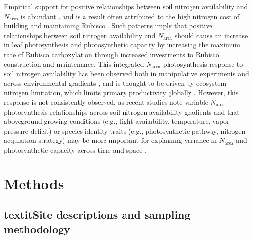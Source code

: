     Empirical support for positive relationships between soil nitrogen availability and $N_\mathrm{area}$ is abundant , and is a result often attributed to the high nitrogen cost of building and maintaining Rubisco . Such patterns imply that positive relationships between soil nitrogen availability and $N_\mathrm{area}$ should cause an increase in leaf photosynthesis and photosynthetic capacity by increasing the maximum rate of Rubisco carboxylation through increased investments to Rubisco construction and maintenance. This integrated $N_\mathrm{area}$-photosynthesis response to soil nitrogen availability has been observed both in manipulative experiments and across environmental gradients , and is thought to be driven by ecosystem nitrogen limitation, which limits primary productivity globally . However, this response is not consistently observed, as recent studies note variable $N_\mathrm{area}$-photosynthesis relationships across soil nitrogen availability gradients  and that aboveground growing conditions (e.g., light availability, temperature, vapor pressure deficit) or species identity traits (e.g., photosynthetic pathway, nitrogen acquisition strategy) may be more important for explaining variance in $N_\mathrm{area}$ and photosynthetic capacity across time and space .

    \section{Methods}

    \subsection{textit{Site descriptions and sampling methodology}}

